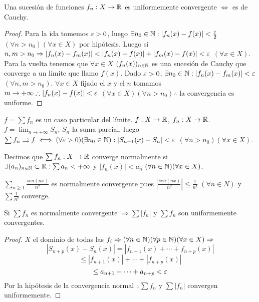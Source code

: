 \begin{theorem}
  Una sucesión de funciones $f_n : X \to \mathbb{R}$ es uniformemente convergente $\iff$ es de Cauchy.
  \begin{proof}
    Para la ida tomemos $\varepsilon > 0$, luego $\exists n_0 \in \mathbb{N} : |f_n(x) - f(x)| < \frac{\varepsilon}{2}$ $(\forall n > n_0)(\forall x \in X)$ por hipótesis. Luego si $n, m > n_0 \Rightarrow |f_n(x) - f_m(x)| < |f_n(x) - f(x)| + |f_m(x) - f(x)| < \varepsilon$ $(\forall x \in X)$. \\
    Para la vuelta tenemos que $\forall x \in X$ $(f_n(x))_{n \in \mathbb{N}}$ es una sucesión de Cauchy que converge a un límite que llamo $f(x)$. Dado $\varepsilon > 0$, $\exists n_0 \in \mathbb{N} : |f_n(x) - f_m(x)| < \varepsilon$ $(\forall n, m > n_0)$. $\forall x \in X$ fijado el $x$ y el $n$ tomamos $m \to +\infty \therefore |f_n(x) - f(x)| < \varepsilon$ $(\forall x \in X)(\forall n > n_0) \therefore$ la convergencia es uniforme.
  \end{proof}
\end{theorem}

$f = \sum f_n$ es un caso particular del límite. $f : X \to \mathbb{R}$, $f_n: X \to \mathbb{R}$. $f = \lim_{n \to +\infty} S_n$, $S_n$ la suma parcial, luego $\sum f_n \rightrightarrows f \iff (\forall \varepsilon > 0)(\exists n_0 \in \mathbb{N}) : |S_{n+1}(x) - S_n| < \varepsilon$ $(\forall n > n_0)(\forall x \in X)$.

\begin{definition}
  Decimos que $\sum f_n: X \to \mathbb{R}$ converge normalmente si $\exists (a_n)_{n \in \mathbb{N}} \subset \mathbb{R} : \sum a_n < +\infty$ y $ |f_n(x)| < a_n$ $(\forall n \in \mathbb{N})(\forall x \in X)$.
\end{definition}

\begin{eg}
  $\sum_{n \geq 1} \frac{sen(nx)}{n^2}$ es normalmente convergente pues $|\frac{sen(nx)}{n^2}| \leq \frac{1}{n²}$ $(\forall n \in N)$ y $\sum \frac{1}{n²}$ converge.
\end{eg}

\begin{theorem}
  Si $\sum f_n$ es normalmente convergente $\Rightarrow \sum |f_n|$ y $\sum f_n$ son uniformemente convergentes.
  \begin{proof}
    $X$ el dominio de todas las $f_i \Rightarrow (\forall n \in \mathbb{N})(\forall p \in \mathbb{N})(\forall x \in X) \Rightarrow$ \begin{equation}
      |S_{n + p}(x) - S_n(x)| = |f_{n+1}(x) + \cdots + f_{n + p}(x)|
    \end{equation}
    \begin{equation}
      \leq |f_{n+1}(x)| + \cdots + |f_{n+p}(x)|
    \end{equation}
    \begin{equation}
      \leq a_{n+1} + \cdots + a_{n+p} < \varepsilon
    \end{equation}
    Por la hipótesis de la convergencia normal $\therefore \sum f_n$ y $\sum |f_n|$ convergen uniformemente.
  \end{proof}
\end{theorem}

